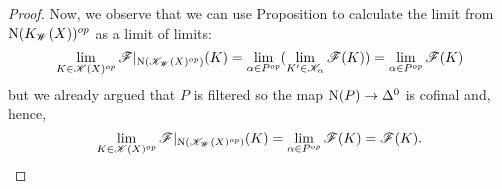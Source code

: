 \documentclass[../../thesis.tex]{subfiles}
\begin{document}
\begin{proof}
    Now, we observe that we can use Proposition \cite[4.2.3.4.]{HTT} to calculate the limit from $\mathrm{N}(K_{\mathscr{W}}(X))^{op}$ as a limit of limits:
    \[
        \lim_{K\in \mathscr{K}(X)^{op}}\mathscr{F}|_{\mathrm{N}(\mathscr{K}_{\mathscr{W}}(X)^{op})}(K) = \lim_{\alpha \in P^{op}}(\lim_{K' \in \mathscr{K}_{\alpha}}\mathscr{F}(K)) = \lim_{\alpha \in P^{op}}\mathscr{F}(K)
    \]
    but we already argued that $P$ is filtered so the map $\mathrm{N}(P) \to \Delta^0$ is cofinal and, hence,
    \[
        \lim_{K\in \mathscr{K}(X)^{op}}\mathscr{F}|_{\mathrm{N}(\mathscr{K}_{\mathscr{W}}(X)^{op})}(K) =  \lim_{\alpha \in P^{op}}\mathscr{F}(K) = \mathscr{F}(K).
    \]
\end{proof}
\end{document}
